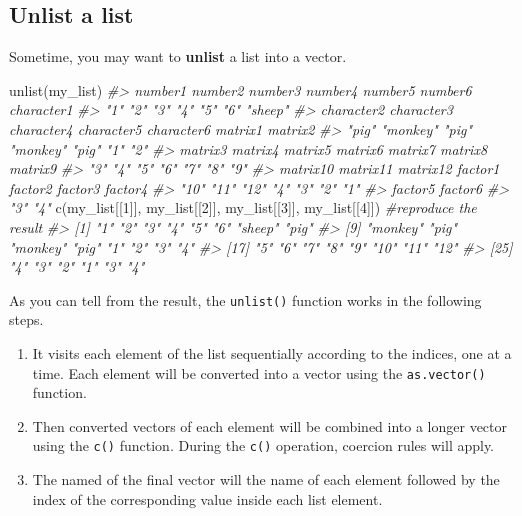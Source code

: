 \documentclass[
]{book}
\newenvironment{Shaded}{\begin{snugshade}}{\end{snugshade}}
\newcommand{\CommentTok}[1]{\textcolor[rgb]{0.56,0.35,0.01}{\textit{#1}}}
\newcommand{\DecValTok}[1]{\textcolor[rgb]{0.00,0.00,0.81}{#1}}
\newcommand{\FunctionTok}[1]{\textcolor[rgb]{0.00,0.00,0.00}{#1}}
\newcommand{\NormalTok}[1]{#1}
\providecommand{\tightlist}{%
  \setlength{\itemsep}{0pt}\setlength{\parskip}{0pt}}
\begin{document}
\hypertarget{unlist-a-list}{%
\subsection{Unlist a list}\label{unlist-a-list}}

Sometime, you may want to \textbf{unlist} a list into a vector.

\begin{Shaded}
\begin{Highlighting}[]
\FunctionTok{unlist}\NormalTok{(my\_list)}
\CommentTok{\#\textgreater{}    number1    number2    number3    number4    number5    number6 character1 }
\CommentTok{\#\textgreater{}        "1"        "2"        "3"        "4"        "5"        "6"    "sheep" }
\CommentTok{\#\textgreater{} character2 character3 character4 character5 character6    matrix1    matrix2 }
\CommentTok{\#\textgreater{}      "pig"   "monkey"      "pig"   "monkey"      "pig"        "1"        "2" }
\CommentTok{\#\textgreater{}    matrix3    matrix4    matrix5    matrix6    matrix7    matrix8    matrix9 }
\CommentTok{\#\textgreater{}        "3"        "4"        "5"        "6"        "7"        "8"        "9" }
\CommentTok{\#\textgreater{}   matrix10   matrix11   matrix12    factor1    factor2    factor3    factor4 }
\CommentTok{\#\textgreater{}       "10"       "11"       "12"        "4"        "3"        "2"        "1" }
\CommentTok{\#\textgreater{}    factor5    factor6 }
\CommentTok{\#\textgreater{}        "3"        "4"}
\FunctionTok{c}\NormalTok{(my\_list[[}\DecValTok{1}\NormalTok{]], my\_list[[}\DecValTok{2}\NormalTok{]], my\_list[[}\DecValTok{3}\NormalTok{]], my\_list[[}\DecValTok{4}\NormalTok{]]) }\CommentTok{\#reproduce the result}
\CommentTok{\#\textgreater{}  [1] "1"      "2"      "3"      "4"      "5"      "6"      "sheep"  "pig"   }
\CommentTok{\#\textgreater{}  [9] "monkey" "pig"    "monkey" "pig"    "1"      "2"      "3"      "4"     }
\CommentTok{\#\textgreater{} [17] "5"      "6"      "7"      "8"      "9"      "10"     "11"     "12"    }
\CommentTok{\#\textgreater{} [25] "4"      "3"      "2"      "1"      "3"      "4"}
\end{Highlighting}
\end{Shaded}

As you can tell from the result, the \texttt{unlist()} function works in the following steps.

\begin{enumerate}
\def\labelenumi{\arabic{enumi}.}
\tightlist
\item
  It visits each element of the list sequentially according to the indices, one at a time. Each element will be converted into a vector using the \texttt{as.vector()} function.
\item
  Then converted vectors of each element will be combined into a longer vector using the \texttt{c()} function. During the \texttt{c()} operation, coercion rules will apply.
\item
  The named of the final vector will the name of each element followed by the index of the corresponding value inside each list element.
\end{enumerate}
\end{document}
